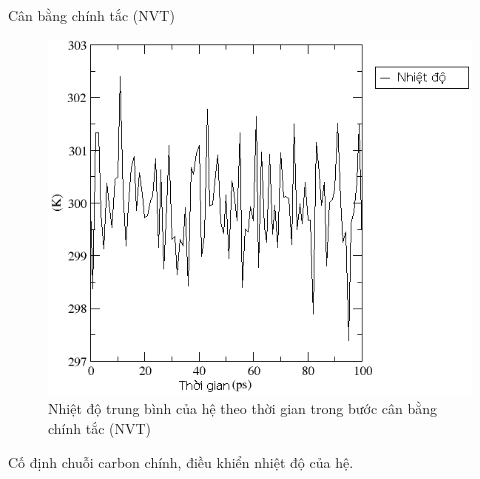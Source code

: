 \documentclass[10pt]{beamer}
\begin{document}
	\begin{frame}{Cân bằng chính tắc (NVT)}
		\begin{figure}[h]
		\centering
		\includegraphics[height=0.35\textheight,natwidth=610,natheight=642]{../25temperature}
		\caption{Nhiệt độ trung bình của hệ theo thời gian trong bước cân bằng chính tắc (NVT)}
		\label{fig:nvt}
		\end{figure}
		Cố định chuỗi carbon chính, điều khiển nhiệt độ của hệ.
	\end{frame}
\end{document}
